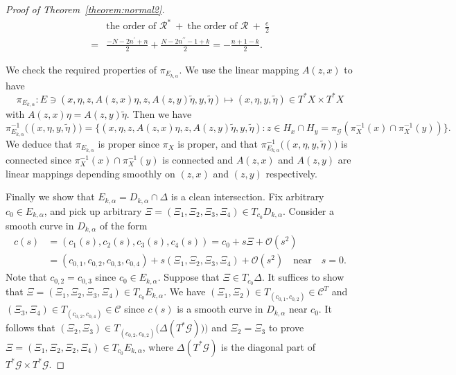 \documentclass[a4paper,11pt,reqno]{amsart}
\theoremstyle{definition}
\theoremstyle{remark}
\begin{document}
\begin{proof}[Proof of Theorem~\ref{theorem:normal2}]
\begin{align*}
& \text{the order of $\mathcal{R}^\ast$}\ 
  +\ 
  \text{the order of $\mathcal{R}$}\ 
  +\
  \frac{e}{2}
\\
  =
& \frac{-N-2n^\prime+n}{2}+\frac{N-2n^{\prime\prime}-1+k}{2}
  =
  -
  \frac{n+1-k}{2}. 
\end{align*}
%
%
\par
%
%
We check the required properties of $\pi_{E_{k,\alpha}}$. 
We use the linear mapping $A(z,x)$ to have 
%
%
$$
\pi_{E_{k,\alpha}}: 
E 
\ni
(x,\eta,z,A(z,x)\eta,z,A(z,y)\tilde{\eta},y,\tilde{\eta})
\mapsto 
(x,\eta,y,\tilde{\eta})
\in 
T^\ast{X}{\times}T^\ast{X} 
$$
%
% 
with $A(z,x)\eta=A(z,y)\tilde{\eta}$. 
Then we have 
%
%
$$
\pi_{E_{k,\alpha}}^{-1}\bigl((x,\eta,y,\tilde{\eta})\bigr)
=
\{
(x,\eta,z,A(z,x)\eta,z,A(z,y)\tilde{\eta},y,\tilde{\eta}) 
: 
z \in H_x{\cap}H_y=\pi_\mathcal{G}(\pi_X^{-1}(x)\cap\pi_X^{-1}(y))
\}. 
$$
%
%
We deduce that $\pi_{E_{k,\alpha}}$ is proper since $\pi_X$ is proper, 
and that $\pi_{E_{k,\alpha}}^{-1}\bigl((x,\eta,y,\tilde{\eta})\bigr)$ is connected 
since $\pi_X^{-1}(x)\cap\pi_X^{-1}(y)$ is connected and 
$A(z,x)$ and $A(z,y)$ are linear mappings depending smoothly on $(z,x)$ and $(z,y)$ respectively. 
%
%
\par
%
%
Finally we show that $E_{k,\alpha}=D_{k,\alpha}\cap\Delta$ is a clean intersection. 
Fix arbitrary $c_0 \in E_{k,\alpha}$, and pick up arbitrary 
$\Xi=(\Xi_1,\Xi_2,\Xi_3,\Xi_4) \in T_{c_0}D_{k,\alpha}$. 
Consider a smooth curve in $D_{k,\alpha}$ of the form 
%
%
\begin{align*}
    c(s)
& =
    (c_1(s),c_2(s),c_3(s),c_4(s))
    =
    c_0+s\Xi+\mathcal{O}(s^2)
\\
&  =
    (c_{0,1},c_{0,2},c_{0,3},c_{0,4})
    +
    s(\Xi_1,\Xi_2,\Xi_3,\Xi_4)
    +
    \mathcal{O}(s^2)
    \quad\text{near}\quad
    s=0.
\end{align*}
%
%
Note that $c_{0,2}=c_{0,3}$ since $c_0 \in E_{k,\alpha}$.  
Suppose that $\Xi \in T_{c_0}\Delta$. 
It suffices to show that  $\Xi=(\Xi_1,\Xi_2,\Xi_3,\Xi_4) \in T_{c_0}E_{k,\alpha}$. 
We have $(\Xi_1,\Xi_2) \in T_{(c_{0,1},c_{0,2})} \in \mathcal{C}^T$ and 
$(\Xi_3,\Xi_4) \in T_{(c_{0,2},c_{0,4})} \in \mathcal{C}$ 
since $c(s)$ is a smooth curve in $D_{k,\alpha}$ near $c_0$. 
It follows  that $(\Xi_2,\Xi_3) \in T_{(c_{0,2},c_{0,2})}\bigl(\Delta(T^\ast\mathcal{G}))\bigr)$ and $\Xi_2=\Xi_3$ to prove $\Xi=(\Xi_1,\Xi_2,\Xi_2,\Xi_4) \in T_{c_0}E_{k,\alpha}$, where $\Delta(T^\ast\mathcal{G})$ is the diagonal part of $T^\ast\mathcal{G}{\times}T^\ast\mathcal{G}$. 
%
\par

\end{proof}
\end{document}
